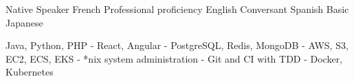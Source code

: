 \begin{cvhonors}
  \cvhonor
    {}
    {Native Speaker}
    {}
    {French}
    \cvhonor
    {}
    {Professional proficiency}
    {}
    {English}
    \cvhonor
    {}
    {Conversant}
    {}
    {Spanish}
    \cvhonor
    {}
    {Basic}
    {}
    {Japanese}
\end{cvhonors}

 Java, Python, PHP
- React, Angular
- PostgreSQL, Redis, MongoDB
- AWS, S3, EC2, ECS, EKS
- *nix system administration
- Git and CI with TDD
- Docker, Kubernetes
